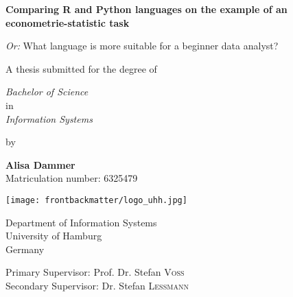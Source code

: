 \begin{titlepage}
    \begin{center}
        \LARGE
        \textbf{Comparing R and Python languages on the example of an econometrie-statistic task }
        
        \vspace{0.5cm}

        \Large
        \textit{Or:} What language is more suitable for a beginner data analyst?

        \vspace{0.5cm}
        
        A thesis submitted for the degree of

        \vspace{0.5cm}

        \emph{Bachelor of Science}\\
        in\\
        \emph{Information Systems}
        
        \vspace{0.6cm}

        by

        \vspace{0.3cm}
        
        \textbf{Alisa Dammer}\\
        {\small Matriculation number: 6325479}
        
        \vspace{0.5cm}
        
        \texttt{[image: frontbackmatter/logo\_uhh.jpg]}
        
    
        \Large
        Department of Information Systems\\
        University of Hamburg\\
        Germany\\

        \vspace{0.8cm}

        \large
        Primary Supervisor: Prof. Dr. Stefan \textsc{Voß}\\
        Secondary Supervisor: Dr. Stefan \textsc{Lessmann}
        
    \end{center}
\end{titlepage}